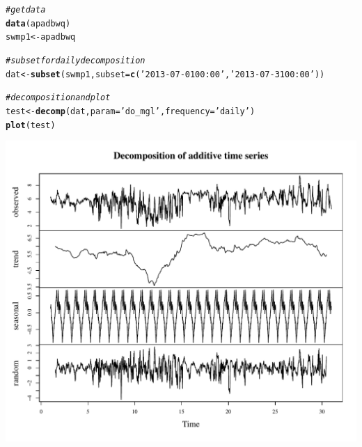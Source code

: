 \documentclass[10pt,letterpaper]{article}\usepackage[]{graphicx}\usepackage[]{color}
\makeatletter
\def\maxwidth{ %
  \ifdim\Gin@nat@width>\linewidth
    \linewidth
  \else
    \Gin@nat@width
  \fi
}
\newcommand{\hlstr}[1]{\textcolor[rgb]{0.192,0.494,0.8}{#1}}%
\newcommand{\hlcom}[1]{\textcolor[rgb]{0.678,0.584,0.686}{\textit{#1}}}%
\newcommand{\hlstd}[1]{\textcolor[rgb]{0.345,0.345,0.345}{#1}}%
\newcommand{\hlkwb}[1]{\textcolor[rgb]{0.69,0.353,0.396}{#1}}%
\newcommand{\hlkwc}[1]{\textcolor[rgb]{0.333,0.667,0.333}{#1}}%
\newcommand{\hlkwd}[1]{\textcolor[rgb]{0.737,0.353,0.396}{\textbf{#1}}}%
\newenvironment{kframe}{%
 \def\at@end@of@kframe{}%
 \ifinner\ifhmode%
  \def\at@end@of@kframe{\end{minipage}}%
  \begin{minipage}{\columnwidth}%
 \fi\fi%
 \def\FrameCommand##1{\hskip\@totalleftmargin \hskip-\fboxsep
 \colorbox{shadecolor}{##1}\hskip-\fboxsep
     \hskip-\linewidth \hskip-\@totalleftmargin \hskip\columnwidth}%
 \MakeFramed {\advance\hsize-\width
   \@totalleftmargin\z@ \linewidth\hsize
   \@setminipage}}%
 {\par\unskip\endMakeFramed%
 \at@end@of@kframe}
\newenvironment{knitrout}{}{} %
\makeatother
\begin{document}
\begin{knitrout}
\color{fgcolor}\begin{kframe}
\begin{alltt}
\hlcom{# get data}
\hlkwd{data}\hlstd{(apadbwq)}
\hlstd{swmp1} \hlkwb{<-} \hlstd{apadbwq}

\hlcom{# subset for daily decomposition}
\hlstd{dat} \hlkwb{<-} \hlkwd{subset}\hlstd{(swmp1,} \hlkwc{subset} \hlstd{=} \hlkwd{c}\hlstd{(}\hlstr{'2013-07-01 00:00'}\hlstd{,} \hlstr{'2013-07-31 00:00'}\hlstd{))}

\hlcom{# decomposition and plot}
\hlstd{test} \hlkwb{<-} \hlkwd{decomp}\hlstd{(dat,} \hlkwc{param} \hlstd{=} \hlstr{'do_mgl'}\hlstd{,} \hlkwc{frequency} \hlstd{=} \hlstr{'daily'}\hlstd{)}
\hlkwd{plot}\hlstd{(test)}
\end{alltt}
\end{kframe}

{\centering \includegraphics[width=\maxwidth]{figure/unnamed-chunk-17} 

}



\end{knitrout}
\end{document}
